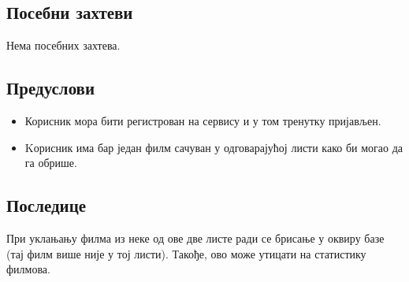 \subsection{Посебни захтеви}

Нема посебних захтева.

\subsection{Предуслови}

\begin{itemize}
    \item Корисник мора бити регистрован на сервису и у том тренутку пријављен. 
    \item Kорисник има бар један филм сачуван у одговарајућој листи како би могао да га обрише.
\end{itemize}

\subsection{Последице}

При уклањању филма из неке од ове две листе ради се брисање у оквиру базе (тај филм више није у тој листи). Такође,
ово може утицати на статистику филмова.


